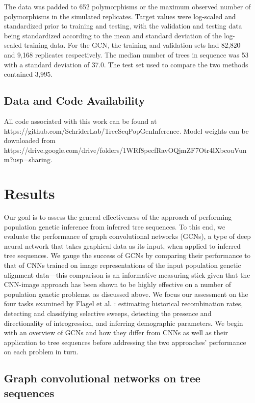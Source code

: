 The data was padded to 652 polymorphisms or the maximum observed number of polymorphisms in the simulated replicates. Target values were log-scaled and standardized prior to training and testing, with the validation and testing data being standardized according to the mean and standard deviation of the log-scaled training data.  For the GCN, the training and validation sets had 82,820 and 9,168 replicates respectively.  The median number of trees in sequence was 53 with a standard deviation of 37.0.  The test set used to compare the two methods contained 3,995.

\subsection{Data and Code Availability}

All code associated with this work can be found at https://github.com/SchriderLab/TreeSeqPopGenInference. Model weights can be downloaded from \\https://drive.google.com/drive/folders/1WRf8pecfRavOQjmZF7Otr4lXbcouVunm?usp=sharing.

\section{Results}

Our goal is to assess the general effectiveness of the approach of performing population genetic inference from inferred tree sequences. To this end, we evaluate the performance of graph convolutional networks (GCNs), a type of deep neural network that takes graphical data as its input, when applied to inferred tree sequences. We gauge the success of GCNs by comparing their performance to that of CNNs trained on image representations of the input population genetic alignment data—this comparison is an informative measuring stick given that the CNN-image approach has been shown to be highly effective on a number of population genetic problems, as discussed above. We focus our assessment on the four tasks examined by Flagel et al. \cite{flagelUnreasonableEffectivenessConvolutional2019}: estimating historical recombination rates, detecting and classifying selective sweeps, detecting the presence and directionality of introgression, and inferring demographic parameters. We begin with an overview of GCNs and how they differ from CNNs as well as their application to tree sequences before addressing the two approaches’ performance on each problem in turn.

\subsection{Graph convolutional networks on tree sequences}

